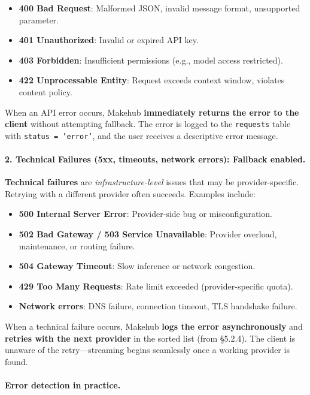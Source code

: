\documentclass[english]{article}
\begin{document}
\begin{itemize}
    \item \textbf{400 Bad Request}: Malformed JSON, invalid message format, unsupported parameter.
    \item \textbf{401 Unauthorized}: Invalid or expired API key.
    \item \textbf{403 Forbidden}: Insufficient permissions (e.g., model access restricted).
    \item \textbf{422 Unprocessable Entity}: Request exceeds context window, violates content policy.
\end{itemize}

When an API error occurs, Makehub \textbf{immediately returns the error to the client} without attempting fallback. The error is logged to the \texttt{requests} table with \texttt{status = 'error'}, and the user receives a descriptive error message.

\paragraph{2. Technical Failures (5xx, timeouts, network errors): Fallback enabled.}

\textbf{Technical failures} are \emph{infrastructure-level} issues that may be provider-specific. Retrying with a different provider often succeeds. Examples include:

\begin{itemize}
    \item \textbf{500 Internal Server Error}: Provider-side bug or misconfiguration.
    \item \textbf{502 Bad Gateway / 503 Service Unavailable}: Provider overload, maintenance, or routing failure.
    \item \textbf{504 Gateway Timeout}: Slow inference or network congestion.
    \item \textbf{429 Too Many Requests}: Rate limit exceeded (provider-specific quota).
    \item \textbf{Network errors}: DNS failure, connection timeout, TLS handshake failure.
\end{itemize}

When a technical failure occurs, Makehub \textbf{logs the error asynchronously} and \textbf{retries with the next provider} in the sorted list (from §5.2.4). The client is unaware of the retry—streaming begins seamlessly once a working provider is found.

\paragraph{Error detection in practice.}
\end{document}
